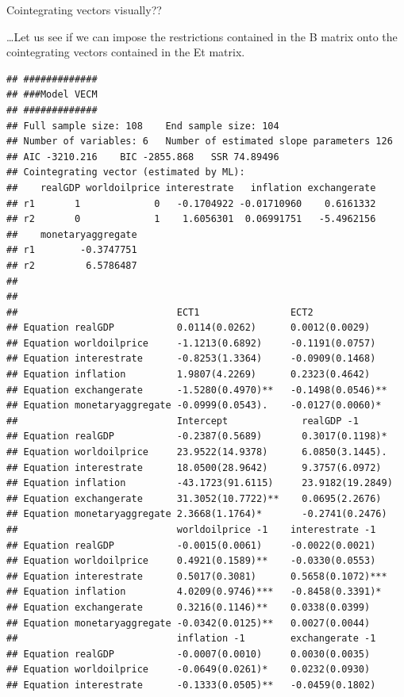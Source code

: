 \documentclass[11pt,preprint, authoryear]{elsarticle}
\numberwithin{equation}{section}
\numberwithin{figure}{section}
\numberwithin{table}{section}
\begin{document}
Cointegrating vectors visually??

\ldots Let us see if we can impose the restrictions contained in the B
matrix onto the cointegrating vectors contained in the Et matrix.

\begin{verbatim}
## #############
## ###Model VECM 
## #############
## Full sample size: 108    End sample size: 104
## Number of variables: 6   Number of estimated slope parameters 126
## AIC -3210.216    BIC -2855.868   SSR 74.89496
## Cointegrating vector (estimated by ML):
##    realGDP worldoilprice interestrate   inflation exchangerate
## r1       1             0   -0.1704922 -0.01710960    0.6161332
## r2       0             1    1.6056301  0.06991751   -5.4962156
##    monetaryaggregate
## r1        -0.3747751
## r2         6.5786487
## 
## 
##                            ECT1                ECT2               
## Equation realGDP           0.0114(0.0262)      0.0012(0.0029)     
## Equation worldoilprice     -1.1213(0.6892)     -0.1191(0.0757)    
## Equation interestrate      -0.8253(1.3364)     -0.0909(0.1468)    
## Equation inflation         1.9807(4.2269)      0.2323(0.4642)     
## Equation exchangerate      -1.5280(0.4970)**   -0.1498(0.0546)**  
## Equation monetaryaggregate -0.0999(0.0543).    -0.0127(0.0060)*   
##                            Intercept             realGDP -1          
## Equation realGDP           -0.2387(0.5689)       0.3017(0.1198)*     
## Equation worldoilprice     23.9522(14.9378)      6.0850(3.1445).     
## Equation interestrate      18.0500(28.9642)      9.3757(6.0972)      
## Equation inflation         -43.1723(91.6115)     23.9182(19.2849)    
## Equation exchangerate      31.3052(10.7722)**    0.0695(2.2676)      
## Equation monetaryaggregate 2.3668(1.1764)*       -0.2741(0.2476)     
##                            worldoilprice -1    interestrate -1    
## Equation realGDP           -0.0015(0.0061)     -0.0022(0.0021)    
## Equation worldoilprice     0.4921(0.1589)**    -0.0330(0.0553)    
## Equation interestrate      0.5017(0.3081)      0.5658(0.1072)***  
## Equation inflation         4.0209(0.9746)***   -0.8458(0.3391)*   
## Equation exchangerate      0.3216(0.1146)**    0.0338(0.0399)     
## Equation monetaryaggregate -0.0342(0.0125)**   0.0027(0.0044)     
##                            inflation -1        exchangerate -1    
## Equation realGDP           -0.0007(0.0010)     0.0030(0.0035)     
## Equation worldoilprice     -0.0649(0.0261)*    0.0232(0.0930)     
## Equation interestrate      -0.1333(0.0505)**   -0.0459(0.1802)    

\end{verbatim}
\end{document}
